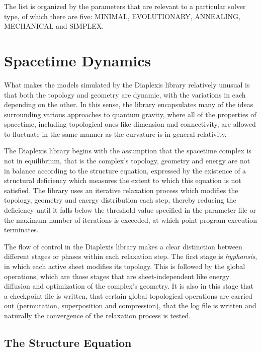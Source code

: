 \documentclass[12pt,letterpaper]{report}
\begin{document}
The list is organized by the parameters that are relevant to a particular solver type, 
of which there are five: MINIMAL, EVOLUTIONARY, ANNEALING, MECHANICAL and SIMPLEX.

\chapter{Spacetime Dynamics}

What makes the models simulated by the Diaplexis library relatively unusual is that 
both the topology and geometry are dynamic, with the variations in each depending on 
the other. In this sense, the library encapsulates many of the ideas surrounding various 
approaches to quantum gravity, where all of the properties of spacetime, including 
topological ones like dimension and connectivity, are allowed to fluctuate in the 
same manner as the curvature is in general relativity. 

The Diaplexis library begins with the assumption that the spacetime complex is not in 
equilibrium, that is the complex's topology, geometry and energy are not in balance 
according to the structure equation, expressed by the existence of a structural deficiency 
which measures the extent to which this equation is not satisfied. The library uses an 
iterative relaxation process which modifies the topology, geometry and energy distribution 
each step, thereby reducing the deficiency until it falls below the threshold value 
specified in the parameter file or the maximum number of iterations is exceeded, at which 
point program execution terminates. 

The flow of control in the Diaplexis library makes a clear distinction between different 
stages or phases within each relaxation step. The first stage is \emph{hyphansis}, in which 
each active sheet modifies its topology. This is followed by the global operations, which 
are those stages that are sheet-independent like energy diffusion and optimization of the 
complex's geometry. It is also in this stage that a checkpoint file is written, that 
certain global topological operations are carried out (permutation, superposition and 
compression), that the log file is written and naturally the convergence of the relaxation 
process is tested.   

\section{The Structure Equation}
\end{document}
